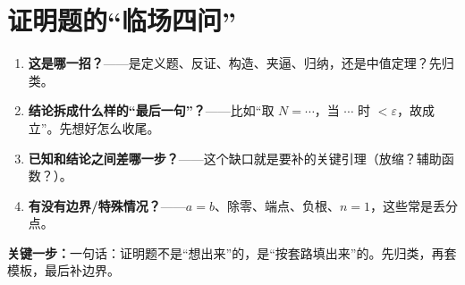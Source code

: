 ﻿\documentclass[11pt,a4paper,UTF8]{ctexart}
\newcommand{\eps}{\varepsilon}
\newcommand{\key}[1]{\par\smallskip\noindent\colorbox{yellow!22}{\textbf{关键一步：}#1}\par\smallskip}
\begin{document}
\section{证明题的“临场四问”}

\begin{enumerate}[leftmargin=1.4em]
\item \textbf{这是哪一招？}——是定义题、反证、构造、夹逼、归纳，还是中值定理？先归类。
\item \textbf{结论拆成什么样的“最后一句”？}——比如“取 $N=\cdots$，当 $\cdots$ 时 $<\eps$，故成立”。先想好怎么收尾。
\item \textbf{已知和结论之间差哪一步？}——这个缺口就是要补的关键引理（放缩？辅助函数？）。
\item \textbf{有没有边界/特殊情况？}——$a=b$、除零、端点、负根、$n=1$，这些常是丢分点。
\end{enumerate}

\key{一句话：证明题不是“想出来”的，是“按套路填出来”的。先归类，再套模板，最后补边界。}
\end{document}
